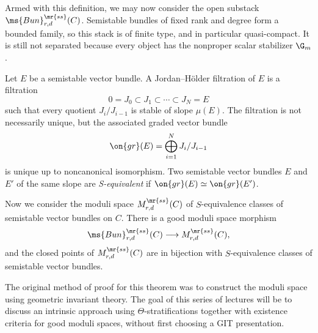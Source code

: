 Armed with this definition, we may now consider the open substack \(\ms{Bun}_{r,d}^{\mr{ss}}(C)\). Semistable bundles of fixed rank and degree form a bounded family, so this stack is of finite type, and in particular quasi-compact. It is still not separated because every object has the nonproper scalar stabilizer \(\G_m\).

\begin{defn}[S-equivalence]
    Let \(E\) be a semistable vector bundle. A Jordan--H\"older filtration of \(E\) is a filtration
    \[ 0=J_0\subset J_1\subset\cdots\subset J_N=E \]
    such that every quotient \(J_i/J_{i-1}\) is stable of slope \(\mu(E)\). The filtration is not necessarily unique, but the associated graded vector bundle
    \[
        \on{gr}(E)=\bigoplus_{i=1}^N J_i/J_{i-1}
    \]
    is unique up to noncanonical isomorphism. Two semistable vector bundles \(E\) and \(E'\) of the same slope are \textit{S-equivalent} if \(\on{gr}(E)\simeq\on{gr}(E')\).
\end{defn}

Now we consider the moduli space \(M_{r,d}^{\mr{ss}}(C)\) of \(S\)-equivalence classes of semistable vector bundles on \(C\). There is a good moduli space morphism
\[
    \ms{Bun}_{r,d}^{\mr{ss}}(C)\longrightarrow M_{r,d}^{\mr{ss}}(C),
\]
and the closed points of \(M_{r,d}^{\mr{ss}}(C)\) are in bijection with \(S\)-equivalence classes of semistable vector bundles.

\begin{rmk}
    The original method of proof for this theorem was to construct the moduli space using geometric invariant theory. The goal of this series of lectures will be to discuss an intrinsic approach using \(\Theta\)-stratifications together with existence criteria for good moduli spaces, without first choosing a GIT presentation.
\end{rmk}


